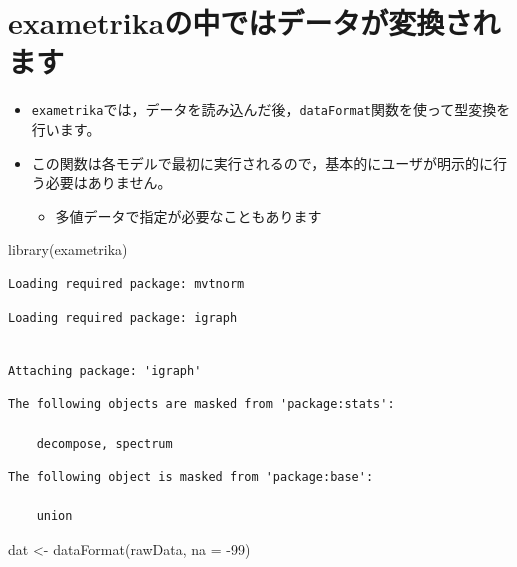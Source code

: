 \documentclass[
  a4paper,
]{ltjsbook}
\newenvironment{Shaded}{\begin{snugshade}}{\end{snugshade}}
\newcommand{\AttributeTok}[1]{\textcolor[rgb]{0.40,0.45,0.13}{#1}}
\newcommand{\DecValTok}[1]{\textcolor[rgb]{0.68,0.00,0.00}{#1}}
\newcommand{\FunctionTok}[1]{\textcolor[rgb]{0.28,0.35,0.67}{#1}}
\newcommand{\NormalTok}[1]{\textcolor[rgb]{0.00,0.23,0.31}{#1}}
\newcommand{\OtherTok}[1]{\textcolor[rgb]{0.00,0.23,0.31}{#1}}
\newcommand{\SpecialCharTok}[1]{\textcolor[rgb]{0.37,0.37,0.37}{#1}}
\providecommand{\tightlist}{%
  \setlength{\itemsep}{0pt}\setlength{\parskip}{0pt}}\usepackage{longtable,booktabs,array}
\begin{document}
\section{exametrikaの中ではデータが変換されます}\label{exametrikaux306eux4e2dux3067ux306fux30c7ux30fcux30bfux304cux5909ux63dbux3055ux308cux307eux3059}

\begin{itemize}
\tightlist
\item
  \texttt{exametrika}では，データを読み込んだ後，\texttt{dataFormat}関数を使って型変換を行います。
\item
  この関数は各モデルで最初に実行されるので，基本的にユーザが明示的に行う必要はありません。

  \begin{itemize}
  \tightlist
  \item
    多値データで指定が必要なこともあります
  \end{itemize}
\end{itemize}

\begin{Shaded}
\begin{Highlighting}[]
\FunctionTok{library}\NormalTok{(exametrika)}
\end{Highlighting}
\end{Shaded}

\begin{verbatim}
Loading required package: mvtnorm
\end{verbatim}

\begin{verbatim}
Loading required package: igraph
\end{verbatim}

\begin{verbatim}

Attaching package: 'igraph'
\end{verbatim}

\begin{verbatim}
The following objects are masked from 'package:stats':

    decompose, spectrum
\end{verbatim}

\begin{verbatim}
The following object is masked from 'package:base':

    union
\end{verbatim}

\begin{Shaded}
\begin{Highlighting}[]
\NormalTok{dat }\OtherTok{\textless{}{-}} \FunctionTok{dataFormat}\NormalTok{(rawData, }\AttributeTok{na =} \SpecialCharTok{{-}}\DecValTok{99}\NormalTok{)}
\end{Highlighting}
\end{Shaded}
\end{document}
